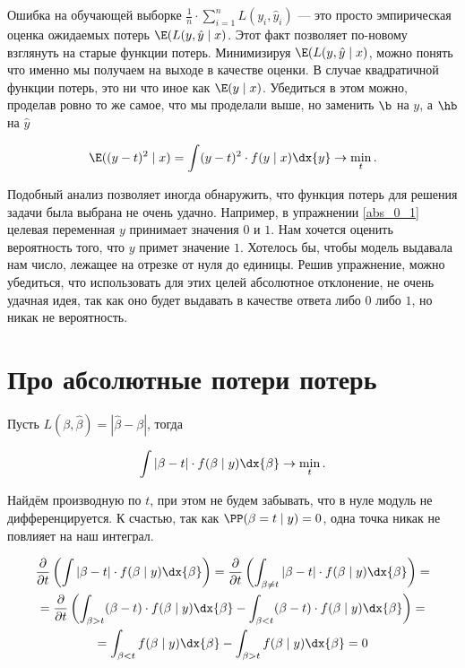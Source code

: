Ошибка на обучающей выборке $\frac{1}{n} \cdot \sum_{i=1}^n L(y_i, \hat y_i)$ --- это просто эмпирическая оценка ожидаемых потерь $\E(L(y, \hat y \mid x)$. Этот факт позволяет по-новому взглянуть на старые функции потерь. Минимизируя $\E(L(y, \hat y \mid x)$, можно понять что именно мы получаем на выходе в качестве оценки. В случае квадратичной функции потерь, это ни что иное как $\E(y \mid x)$. Убедиться в этом можно, проделав ровно то же самое, что мы проделали выше, но заменить $\b$ на $y$, а $\hb$ на $\hat y$

\[ \E((y-t)^2 \mid x) = \int (y - t)^2 \cdot f(y \mid x) \dx{y} \to \min_{t}.\] 

Подобный анализ позволяет иногда обнаружить, что функция потерь для решения задачи была выбрана не очень удачно. Например, в упражнении \ref{abs_0_1} целевая переменная $y$ принимает значения $0$ и $1$. Нам хочется оценить вероятность того, что $y$ примет значение $1$. Хотелось бы, чтобы модель выдавала нам число, лежащее на отрезке от нуля до единицы. Решив упражнение, можно убедиться, что использовать для этих целей абсолютное отклонение, не очень удачная идея, так как оно будет выдавать в качестве ответа либо $0$ либо $1$, но никак не вероятность.   


\section{Про абсолютные потери потерь} 

Пусть $L(\beta,  \hat \beta) = |\hat \beta - \beta|$, тогда

\[ \int |\beta - t| \cdot f(\beta \mid y) \dx{\beta} \to \min_{t}. \] 

Найдём производную по $t$, при этом не будем забывать, что в нуле модуль не дифференцируется. К счастью, так как $\PP(\beta = t \mid y) = 0$, одна точка никак не повлияет на наш интеграл.

\begin{multline*}
\frac{\partial }{\partial t} \left(  \int |\beta - t| \cdot f(\beta \mid y) \dx{\beta}   \right) = \frac{\partial }{\partial t} \left(  \int_{\beta \neq t} |\beta - t| \cdot f(\beta \mid y) \dx{\beta}   \right) = \\ = \frac{\partial }{\partial t} \left( \int_{\beta > t} (\beta - t) \cdot f(\beta \mid y) \dx{\beta} - \int_{\beta < t} (\beta - t) \cdot f( \beta \mid y) \dx{\beta}  \right) = \\
= \int_{\beta < t} f(\beta \mid y) \dx{\beta} - \int_{\beta > t} f( \beta \mid y) \dx{\beta} = 0
\end{multline*}

